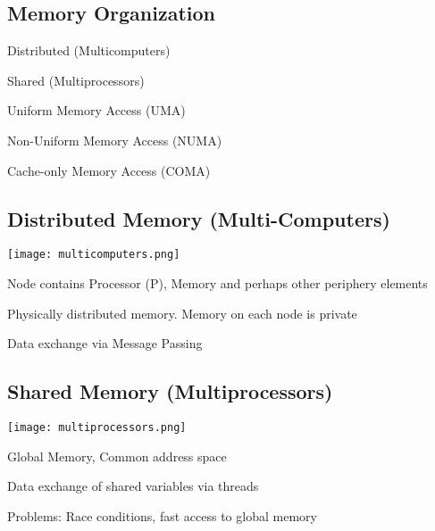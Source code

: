 \documentclass[12pt]{article}
\begin{document}
\begin{spacing}{1.5}
\section{Memory Organization}

\begin{itemize*}
	\item Distributed (Multicomputers)
	\item Shared (Multiprocessors)
		\begin{itemize*}
			\item Uniform Memory Access (UMA)
			\item Non-Uniform Memory Access (NUMA)
			\item Cache-only Memory Access (COMA)
		\end{itemize*}
\end{itemize*}

\subsection{Distributed Memory (Multi-Computers)}


\begin{center}
\texttt{[image: multicomputers.png]}
\end{center}

\begin{itemize*}
	\item Node contains Processor (P), Memory and perhaps other periphery elements
	\item Physically distributed memory. Memory on each node is private
	\item Data exchange via Message Passing
\end{itemize*}

\subsection{Shared Memory (Multiprocessors)}

\begin{center}
\texttt{[image: multiprocessors.png]}
\end{center}

\begin{itemize*}
	\item Global Memory, Common address space
	\item Data exchange of shared variables via threads
	\item Problems: Race conditions, fast access to global memory
\end{itemize*}


\end{spacing}
\end{document}
